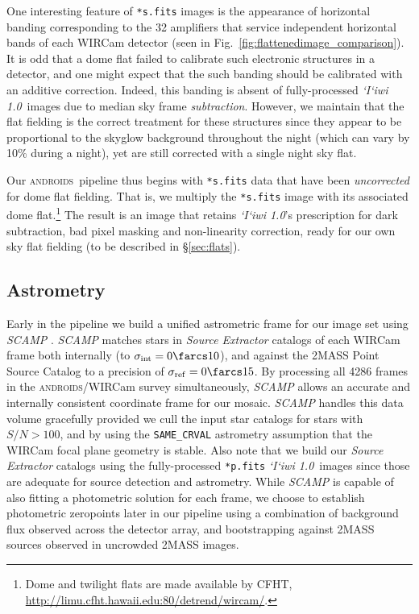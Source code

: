 \documentclass[iop]{emulateapj}
\newcommand{\sw}[1]{\textit{#1}} %
\newcommand{\iiwione}{\sw{`I`iwi 1.0}}
\newcommand{\androids}{\textsc{androids}}
\newcommand{\Fig}[1]{Fig.~\ref{fig:#1}}  %
\newcommand{\Sec}[1]{\S\ref{sec:#1}}  %
\begin{document}
One interesting feature of \texttt{*s.fits} images is the appearance of horizontal banding corresponding to the 32 amplifiers that service independent horizontal bands of each WIRCam detector (seen in \Fig{flattenedimage_comparison}).
It is odd that a dome flat failed to calibrate such electronic structures in a detector, and one might expect that the such banding should be calibrated with an additive correction.
Indeed, this banding is absent of fully-processed \iiwione\ images due to median sky frame \textit{subtraction}.
However, we maintain that the flat fielding is the correct treatment for these structures since they appear to be proportional to the skyglow background throughout the night (which can vary by 10\% during a night), yet are still corrected with a single night sky flat.

Our \androids\ pipeline thus begins with \texttt{*s.fits} data that have been \textit{uncorrected} for dome flat fielding.
That is, we multiply the \texttt{*s.fits} image with its associated dome flat.\footnote{Dome and twilight flats are made available by CFHT, \url{http://limu.cfht.hawaii.edu:80/detrend/wircam/}.}
The result is an image that retains \iiwione's prescription for dark subtraction, bad pixel masking and non-linearity correction, ready for our own sky flat fielding (to be described in \Sec{flats}).

\subsection{Astrometry}

Early in the pipeline we build a unified astrometric frame for our image set using \sw{SCAMP} \citep{Bertin:2006}.
\sw{SCAMP} matches stars in \sw{Source Extractor} \citep{Bertin:1996} catalogs of each WIRCam frame both internally (to $\sigma_\mathrm{int}=0\farcs 10$), and against the 2MASS Point Source Catalog \citep{Skrutskie:2006} to a precision of $\sigma_\mathrm{ref}=0 \farcs 15$.
By processing all 4286 frames in the \androids /WIRCam survey simultaneously, \sw{SCAMP} allows an accurate and internally consistent coordinate frame for our mosaic.
\sw{SCAMP} handles this data volume gracefully provided we cull the input star catalogs for stars with $S/N > 100$, and by using the \texttt{SAME\_CRVAL} astrometry assumption that the WIRCam focal plane geometry is stable.
Also note that we build our \sw{Source Extractor} catalogs using the fully-processed \texttt{*p.fits} \iiwione\ images since those are adequate for source detection and astrometry.
While \sw{SCAMP} is capable of also fitting a photometric solution for each frame, we choose to establish photometric zeropoints later in our pipeline using a combination of background flux observed across the detector array, and bootstrapping against 2MASS sources observed in uncrowded 2MASS images.
\end{document}
